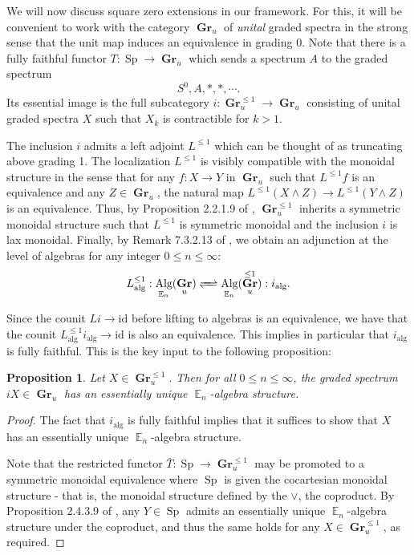 \documentclass[reqno, oneside]{amsart}
\theoremstyle{definition}
\theoremstyle{plain}
\newtheorem{prop}[nul]{Proposition}
\DeclareMathOperator{\E}{\mathbb{E}}
\DeclareMathOperator{\Gr}{\textbf{Gr}}
\DeclareMathOperator{\Alg}{\text{Alg}}
\DeclareMathOperator{\Sp}{\text{Sp}}
\begin{document}
We will now discuss square zero extensions in our framework.  For this, it will be convenient to work with the category $\Gr_u$ of \emph{unital} graded spectra in the strong sense that the unit map induces an equivalence in grading 0.  
Note that there is a fully faithful functor $T:\Sp \to \Gr_u$ which sends a spectrum $A$ to the graded spectrum $$S^0, A, *, *, \cdots.$$  Its essential image is the full subcategory $i: \Gr^{\leq 1}_u \to \Gr_u$ consisting of unital graded spectra $X$ such that $X_k$ is contractible for $k>1$.  

The inclusion $i$ admits a left adjoint $L^{\leq 1}$ which can be thought of as truncating above grading 1.  The localization $L^{\leq 1}$ is visibly compatible with the monoidal structure in the sense that for any $f:X\to Y$ in $\Gr_u$ such that $L^{\leq 1}f$ is an equivalence and any $Z\in \Gr_u$, the natural map $L^{\leq 1} (X\wedge Z) \to L^{\leq 1}(Y\wedge Z)$ is an equivalence.  Thus, by Proposition 2.2.1.9 of \cite{HA}, $\Gr_u^{\leq 1}$ inherits a symmetric monoidal structure such that $L^{\leq 1}$ is symmetric monoidal and the inclusion $i$ is lax monoidal.  Finally, by Remark 7.3.2.13 of \cite{HA}, we obtain an adjunction at the level of algebras for any integer $0\leq n\leq \infty$:
$$L^{\leq 1}_{\text{alg}}: \Alg_{\E_n}( \Gr_u)  \xrightleftharpoons{\quad} \Alg_{\E_n}(\Gr_u^{\leq 1}) : i_{\text{alg}}.$$

Since the counit $Li \to \text{id}$ before lifting to algebras is an equivalence, we have that the counit $L^{\leq 1}_{\text{alg}}  i_{\text{alg}} \to \text{id}$ is also an equivalence.  This implies in particular that $i_{\text{alg}}$ is fully faithful.  This is the key input to the following proposition:

\begin{prop}
Let $X\in \Gr_u^{\leq 1}.$  Then for all $0\leq n\leq \infty$, the graded spectrum $iX\in \Gr_u$ has an essentially unique $\E_n$-algebra structure.  
\end{prop}
\begin{proof}
The fact that $i_{\text{alg}}$ is fully faithful implies that it suffices to show that $X$ has an essentially unique $\E_n$-algebra structure.  

Note that the restricted functor $\bar{T}: \Sp \to \Gr^{\leq 1}_u$ may be promoted to a symmetric monoidal equivalence where $\Sp$ is given the cocartesian monoidal structure - that is, the monoidal structure defined by the $\vee$, the coproduct.   By Proposition 2.4.3.9 of \cite{HA}, any $Y\in \Sp$ admits an essentially unique $\E_n$-algebra structure under the coproduct, and thus the same holds for any $X\in \Gr^{\leq 1}_u$, as required.  
\end{proof}
\end{document}
